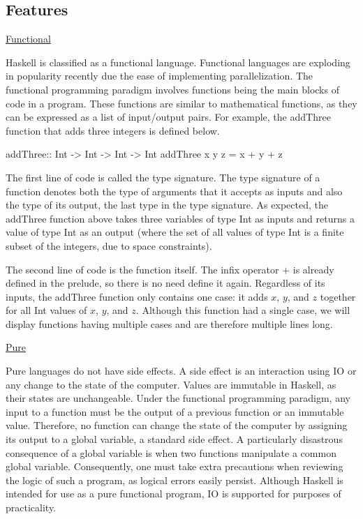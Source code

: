 \documentclass[11pt]{article}
\begin{document}
\subsection{Features}

\hspace{0.5cm}\underline{Functional}

Haskell is classified as a functional language. Functional languages are exploding in popularity recently due the ease of implementing parallelization. The functional programming paradigm involves functions being the main blocks of code in a program. These functions are similar to mathematical functions, as they can be expressed as a list of input/output pairs. For example, the addThree function that adds three integers is defined below.

\hspace{2cm}\begin{verbbox}
addThree:: Int -> Int -> Int -> Int
addThree x y z = x + y + z
\end{verbbox}
\theverbbox

The first line of code is called the type signature. The type signature of a function denotes both the type of arguments that it accepts as inputs and also the type of its output, the last type in the type signature. As expected, the addThree function above takes three variables of type Int as inputs and returns a value of type Int as an output (where the set of all values of type Int is a finite subset of the integers, due to space constraints). 

The second line of code is the function itself. The infix operator $+$ is already defined in the prelude, so there is no need define it again. Regardless of its inputs, the addThree function only contains one case: it adds $x$, $y$, and $z$ together for all Int values of $x$, $y$, and $z$. Although this function had a single case, we will display functions having multiple cases and are therefore multiple lines long. 

\hspace{0.5cm}\underline{Pure}

Pure languages do not have side effects. A side effect is an interaction using IO or any change to the state of the computer. Values are immutable in Haskell, as their states are unchangeable. Under the functional programming paradigm, any input to a function must be the output of a previous function or an immutable value. Therefore, no function can change the state of the computer by assigning its output to a global variable, a standard side effect. A particularly disastrous consequence of a global variable is when two functions manipulate a common global variable. Consequently, one must take extra precautions when reviewing the logic of such a program, as logical errors easily persist. Although Haskell is intended for use as a pure functional program, IO is supported for purposes of practicality. 
\end{document}
